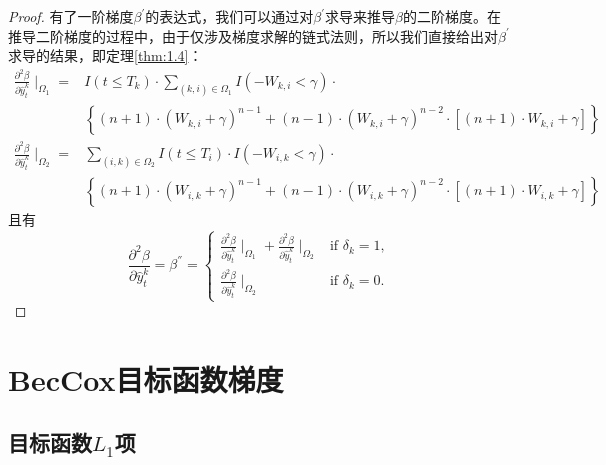 \begin{proof}
有了一阶梯度$\beta^{'}$的表达式，我们可以通过对$\beta^{'}$求导来推导$\beta$的二阶梯度。在推导二阶梯度的过程中，由于仅涉及梯度求解的链式法则，所以我们直接给出对$\beta^{'}$求导的结果，即定理\ref{thm:1.4}：\[
\begin{split}
\frac{\partial^2 \beta}{\partial \hat{y}_t^k} \mid_{\Omega_1} =& I(t\le T_k)\cdot \sum\limits_{(k,i)\in \Omega_1} I(-W_{k,i}<\gamma)\cdot \\
  & \left\{(n+1)\cdot (W_{k,i}+\gamma)^{n-1} + (n-1)\cdot (W_{k,i}+\gamma)^{n-2}\cdot [(n+1)\cdot W_{k,i}+\gamma]\right\} \\
\frac{\partial^2 \beta}{\partial \hat{y}_t^k} \mid_{\Omega_2} =& \sum\limits_{(i,k)\in \Omega_2} I(t\le T_i)\cdot I(-W_{i,k}<\gamma)\cdot \\
  & \left\{(n+1)\cdot (W_{i,k}+\gamma)^{n-1} + (n-1)\cdot (W_{i,k}+\gamma)^{n-2}\cdot [(n+1)\cdot W_{i,k}+\gamma]\right\}
\end{split}
\] 且有$$
\frac{\partial^2 \beta}{\partial \hat{y}_t^k}=\beta^{''}=
\begin{cases}
\frac{\partial^2 \beta}{\partial \hat{y}_t^k} \mid_{\Omega_1} + \frac{\partial^2 \beta}{\partial \hat{y}_t^k} \mid_{\Omega_2} & \text{if } \delta_k = 1,\\
\frac{\partial^2 \beta}{\partial \hat{y}_t^k} \mid_{\Omega_2} & \text{if } \delta_k = 0.
\end{cases}
$$
\end{proof}

\section{BecCox目标函数梯度}

\subsection{目标函数$L_1$项}

